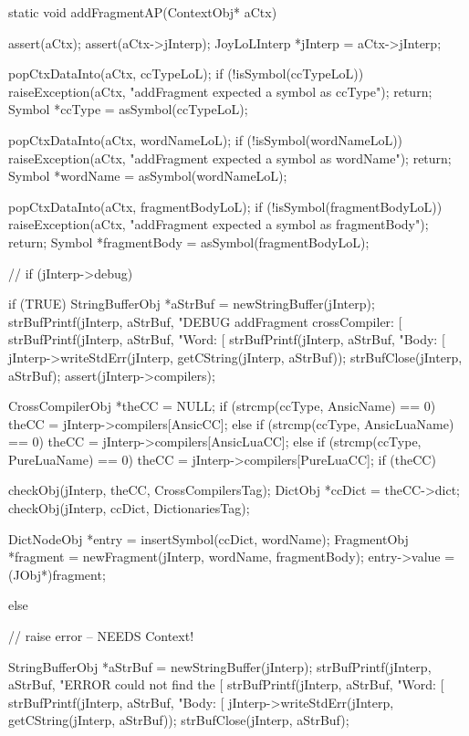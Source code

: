 {\startTestSuite[addFragment]

\startCCode
static void addFragmentAP(ContextObj* aCtx) {
  assert(aCtx);
  assert(aCtx->jInterp);
  JoyLoLInterp *jInterp = aCtx->jInterp;

  popCtxDataInto(aCtx, ccTypeLoL);
  if (!isSymbol(ccTypeLoL)) {
    raiseException(aCtx,
      "addFragment expected a symbol as ccType");
    return;
  }
  Symbol *ccType = asSymbol(ccTypeLoL);
  
  popCtxDataInto(aCtx, wordNameLoL);
  if (!isSymbol(wordNameLoL)) {
    raiseException(aCtx,
      "addFragment expected a symbol as wordName");
    return;
  }
  Symbol *wordName = asSymbol(wordNameLoL);
  
  popCtxDataInto(aCtx, fragmentBodyLoL);
  if (!isSymbol(fragmentBodyLoL)) {
    raiseException(aCtx,
      "addFragment expected a symbol as fragmentBody");
    return;
  }
  Symbol *fragmentBody = asSymbol(fragmentBodyLoL);
  
//  if (jInterp->debug) {
  if (TRUE) {
    StringBufferObj *aStrBuf = newStringBuffer(jInterp);
    strBufPrintf(jInterp, aStrBuf, 
      "DEBUG addFragment crossCompiler: [%
    strBufPrintf(jInterp, aStrBuf, "Word: [%
    strBufPrintf(jInterp, aStrBuf, "Body: [%
    jInterp->writeStdErr(jInterp, getCString(jInterp, aStrBuf));
    strBufClose(jInterp, aStrBuf);
  }
  assert(jInterp->compilers);

  CrossCompilerObj *theCC = NULL;
  if (strcmp(ccType, AnsicName) == 0) {
    theCC = jInterp->compilers[AnsicCC];
  } else if (strcmp(ccType, AnsicLuaName) == 0) {
    theCC = jInterp->compilers[AnsicLuaCC];
  } else if (strcmp(ccType, PureLuaName) == 0) {
    theCC = jInterp->compilers[PureLuaCC];
  }
  if (theCC) {
    checkObj(jInterp, theCC, CrossCompilersTag);
    DictObj *ccDict = theCC->dict;
    checkObj(jInterp, ccDict, DictionariesTag);
    
    DictNodeObj *entry    = insertSymbol(ccDict, wordName);
    FragmentObj *fragment =
      newFragment(jInterp, wordName, fragmentBody);
    entry->value = (JObj*)fragment;
  } else {
    // raise error -- NEEDS Context!
    
    StringBufferObj *aStrBuf = newStringBuffer(jInterp);
    strBufPrintf(jInterp, aStrBuf, 
      "ERROR could not find the [%
    strBufPrintf(jInterp, aStrBuf, "Word: [%
    strBufPrintf(jInterp, aStrBuf, "Body: [%
    jInterp->writeStdErr(jInterp, getCString(jInterp, aStrBuf));
    strBufClose(jInterp, aStrBuf);
  }
}

}}
